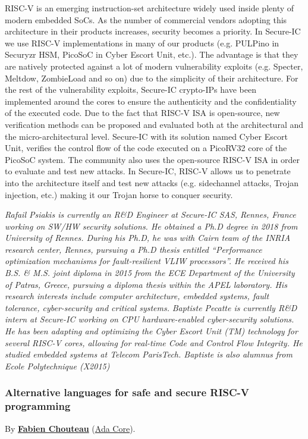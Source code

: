 \documentclass[a4paper, 10pt]{article}
\begin{document}
{RISC-V is an emerging instruction-set architecture widely used inside
plenty of modern embedded SoCs. As the number of commercial vendors
adopting this architecture in their products increases, security becomes
a priority. In Secure-IC we use RISC-V implementations in many of our
products (e.g. PULPino in Securyzr HSM, PicoSoC in Cyber Escort Unit,
etc.). The advantage is that they are natively protected against a lot
of modern vulnerability exploits (e.g. Specter, Meltdow, ZombieLoad and
so on) due to the simplicity of their architecture. For the rest of the
vulnerability exploits, Secure-IC crypto-IPs have been implemented
around the cores to ensure the authenticity and the confidentiality of
the executed code. Due to the fact that RISC-V ISA is open-source, new
verification methods can be proposed and evaluated both at the
architectural and the micro-architectural level. Secure-IC with its
solution named Cyber Escort Unit, verifies the control flow of the code
executed on a PicoRV32 core of the PicoSoC system. The community also
uses the open-source RISC-V ISA in order to evaluate and test new
attacks. In Secure-IC, RISC-V allows us to penetrate into the
architecture itself and test new attacks (e.g. sidechannel attacks,
Trojan injection, etc.) making it our Trojan horse to conquer security.

\emph{\footnotesize Rafail Psiakis is currently an R\&D Engineer at Secure-IC SAS, Rennes, France working on SW/HW security solutions. He obtained a Ph.D degree in 2018 from University of Rennes. During his Ph.D, he was with Cairn team of the INRIA research center, Rennes, pursuing a Ph.D thesis entitled ``Performance optimization mechanisms for fault-resilient VLIW processors''. He received his B.S. \& M.S. joint diploma in 2015 from the ECE Department of the University of Patras, Greece, pursuing a diploma thesis within the APEL laboratory. His research interests include computer architecture, embedded systems, fault tolerance, cyber-security and critical systems.}
\emph{\footnotesize Baptiste Pecatte is currently R\&D intern at Secure-IC working on CPU hardware-enabled cyber-security solutions. He has been adapting and optimizing the Cyber Escort Unit (TM) technology for several RISC-V cores, allowing for real-time Code and Control Flow Integrity. He studied embedded systems at Telecom ParisTech. Baptiste is also alumnus from Ecole Polytechnique (X2015)}

\subsubsection{Alternative languages for safe and secure RISC-V programming}
\label{sec:orgc9cca85}
By \textbf{\href{https://twitter.com/deschips}{Fabien Chouteau}}
(\href{https://www.adacore.com}{Ada Core}).

}
\end{document}
